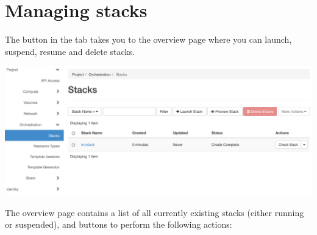 \section{Managing stacks}\label{sec:managing-stacks}
The  button in the  tab takes you
to the overview page where you can launch, suspend, resume and delete
stacks.
\begin{center}
  \includegraphics[width=\textwidth]{img/stacks_overview}
\end{center}
The overview page contains a list of all currently existing stacks
(either running or suspended), and buttons to perform the following
actions:

